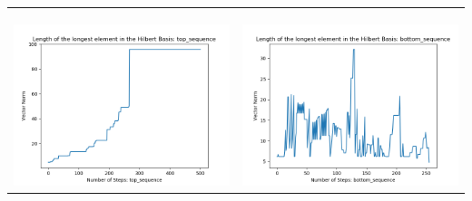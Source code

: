 \documentclass[10pt]{article}
\begin{document}
\begin{tabular}{c|c}
\begin{minipage}{.45\textwidth}
\end{minipage} \\ \\
\hline \\\begin{minipage}{.45\textwidth}
\includegraphics[width=\textwidth]{"DATA/4d/5 generators 2 bound J/top_sequence LENGTH"}
\end{minipage} &
\begin{minipage}{.45\textwidth}
\includegraphics[width=\textwidth]{"DATA/4d/5 generators 2 bound J bottomup/bottom_sequence LENGTH"}
\end{minipage}
\end{tabular}
\end{document}
